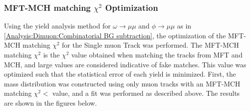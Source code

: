         \subsubsection{MFT-MCH matching $\chi^2$ Optimization}
        \label{matching_chi2_opt}
            Using the yield analysis method for $\omega \rightarrow \mu \mu$ and $\phi \rightarrow \mu \mu$ as in \ref{Analysis:Dimuon:Combinatorial BG subtraction}, the optimization of the MFT-MCH matching $\chi^2$ for the Single muon Track was performed. The MFT-MCH matching $\chi^2$ is the $\chi^2$ value obtained when matching the tracks from MFT and MCH, and large values are considered indicative of fake matches. This value was optimized such that the statistical error of each yield is minimized. First, the mass distribution was constructed using only muon tracks with an MFT-MCH matching $\chi^2<$ value, and a fit was performed as described above. The results are shown in the figures below.
